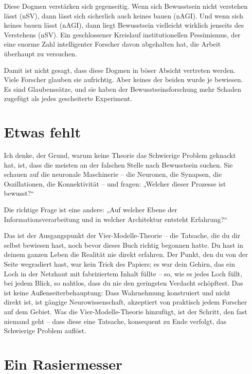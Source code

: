 \documentclass[11pt, twoside, openright]{book}
\begin{document}
Diese Dogmen verstärken sich gegenseitig. Wenn sich Bewusstsein nicht verstehen lässt (nSV), dann lässt sich sicherlich auch keines bauen (nAGI). Und wenn sich keines bauen lässt (nAGI), dann liegt Bewusstsein vielleicht wirklich jenseits des Verstehens (nSV). Ein geschlossener Kreislauf institutionellen Pessimismus, der eine enorme Zahl intelligenter Forscher davon abgehalten hat, die Arbeit überhaupt zu versuchen.

Damit ist nicht gesagt, dass diese Dogmen in böser Absicht vertreten werden. Viele Forscher glauben sie aufrichtig. Aber keines der beiden wurde je bewiesen. Es sind Glaubenssätze, und sie haben der Bewusstseinsforschung mehr Schaden zugefügt als jedes gescheiterte Experiment.

\section*{Etwas fehlt}

Ich denke, der Grund, warum keine Theorie das Schwierige Problem geknackt hat, ist, dass die meisten an der falschen Stelle nach Bewusstsein suchen. Sie schauen auf die neuronale Maschinerie -- die Neuronen, die Synapsen, die Oszillationen, die Konnektivität -- und fragen: „Welcher dieser Prozesse ist bewusst?“

Die richtige Frage ist eine andere: „Auf welcher Ebene der Informationsverarbeitung und in welcher Architektur entsteht Erfahrung?“

Das ist der Ausgangspunkt der Vier-Modelle-Theorie -- die Tatsache, die du dir selbst bewiesen hast, noch bevor dieses Buch richtig begonnen hatte. Du hast in deinem ganzen Leben die Realität nie direkt erfahren. Der Punkt, den du von der Seite wegradiert hast, war kein Trick des Papiers; es war dein Gehirn, das ein Loch in der Netzhaut mit fabriziertem Inhalt füllte -- so, wie es jedes Loch füllt, bei jedem Blick, so nahtlos, dass du nie den geringsten Verdacht schöpftest. Das ist keine Außenseiterbehauptung: Dass Wahrnehmung konstruiert und nicht direkt ist, ist gängige Neurowissenschaft, akzeptiert von praktisch jedem Forscher auf dem Gebiet. Was die Vier-Modelle-Theorie hinzufügt, ist der Schritt, den fast niemand geht -- dass diese eine Tatsache, konsequent zu Ende verfolgt, das Schwierige Problem auflöst.

\section*{Ein Rasiermesser}
\end{document}
